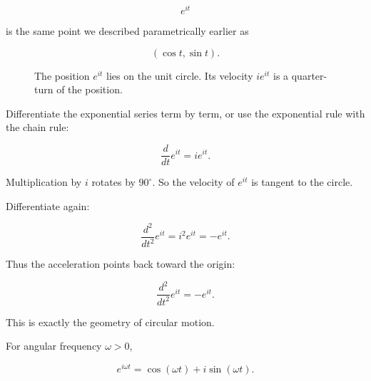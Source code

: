 \[
e^{it}
\]

is the same point we described parametrically earlier as

\[
(\cos t,\sin t).
\]

\begin{figure}[h]
\centering
{}
\caption{The position \(e^{it}\) lies on the unit circle.  Its velocity \(ie^{it}\) is a quarter-turn of the position.}
\label{fig:eit-position-velocity}
\end{figure}

Differentiate the exponential series term by term, or use the exponential rule with the
chain rule:

\[
\boxed{
\frac{d}{dt}e^{it}=ie^{it}.
}
\]

Multiplication by \(i\) rotates by \(90^\circ\).  So the velocity of \(e^{it}\) is tangent to
the circle.

Differentiate again:

\[
\frac{d^2}{dt^2}e^{it}
=
i^2e^{it}
=
-e^{it}.
\]

Thus the acceleration points back toward the origin:

\[
\boxed{
\frac{d^2}{dt^2}e^{it}=-e^{it}.
}
\]

This is exactly the geometry of circular motion.

For angular frequency \(\omega>0\),

\[
e^{i\omega t}
=
\cos(\omega t)+i\sin(\omega t).
\]

